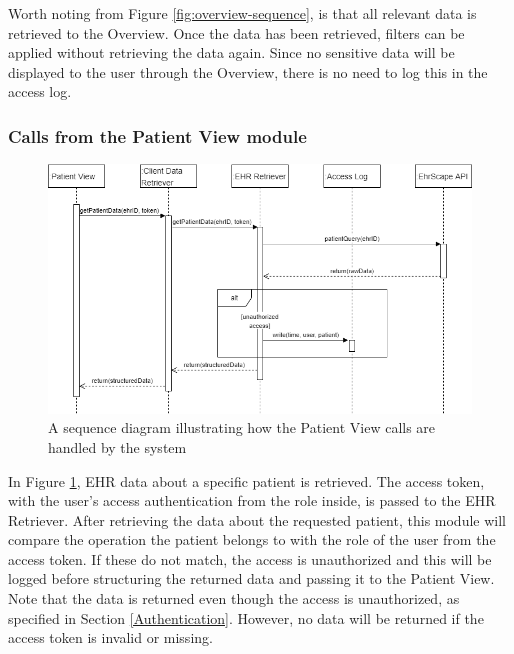 \documentclass{article}
\begin{document}
Worth noting from Figure \ref{fig:overview-sequence}, is that all relevant data is retrieved to the Overview. Once the data has been retrieved, filters can be applied without retrieving the data again. Since no sensitive data will be displayed to the user through the Overview, there is no need to log this in the access log.

\subsubsection{Calls from the Patient View module}
\begin{figure}[h]
    \centering
    \includegraphics[scale = 0.45]{patient-sequence}
    \caption{A sequence diagram illustrating how the Patient View calls are handled by the system}
    \label{fig:patient-sequence}
\end{figure}

In Figure \ref{fig:patient-sequence}, EHR data about a specific patient is retrieved. The access token, with the user's access authentication from the role inside, is passed to the EHR Retriever. After retrieving the data about the requested patient, this module will compare the operation the patient belongs to with the role of the user from the access token. If these do not match, the access is unauthorized and this will be logged before structuring the returned data and passing it to the Patient View. Note that the data is returned even though the access is unauthorized, as specified in Section \ref{Authentication}. However, no data will be returned if the access token is invalid or missing.
\end{document}
